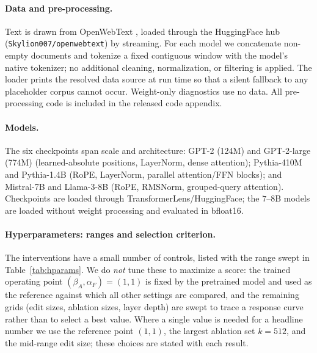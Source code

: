 \documentclass[11pt]{article}
\begin{document}
\paragraph{Data and pre-processing.}
Text is drawn from OpenWebText \citep{gokaslan2019openwebtext}, loaded through the
HuggingFace hub (\texttt{Skylion007/\allowbreak openwebtext}) by streaming. For each
model we concatenate non-empty documents and tokenize a fixed contiguous window with
the model's native tokenizer; no additional cleaning, normalization, or filtering is
applied. The loader prints the resolved data source at run time so that a silent
fallback to any placeholder corpus cannot occur. Weight-only diagnostics use no data.
All pre-processing code is included in the released code appendix.
 
\paragraph{Models.}
The six checkpoints span scale and architecture: GPT-2 (124M) and GPT-2-large (774M)
(learned-absolute positions, LayerNorm, dense attention); Pythia-410M and Pythia-1.4B
(RoPE, LayerNorm, parallel attention/FFN blocks); and Mistral-7B and Llama-3-8B
(RoPE, RMSNorm, grouped-query attention). Checkpoints are loaded through
TransformerLens/HuggingFace; the $7$--$8$B models are loaded without weight processing
and evaluated in bfloat16.

\paragraph{Hyperparameters: ranges and selection criterion.}
The interventions have a small number of controls, listed with the range swept in
Table~\ref{tab:hparams}. We do \emph{not} tune these to maximize a score: the trained
operating point $(\beta_A,\alpha_F)=(1,1)$ is fixed by the pretrained model and used
as the reference against which all other settings are compared, and the remaining
grids (edit sizes, ablation sizes, layer depth) are swept to trace a response curve
rather than to select a best value. Where a single value is needed for a headline
number we use the reference point $(1,1)$, the largest ablation set $k{=}512$, and the
mid-range edit size; these choices are stated with each result.
\end{document}
